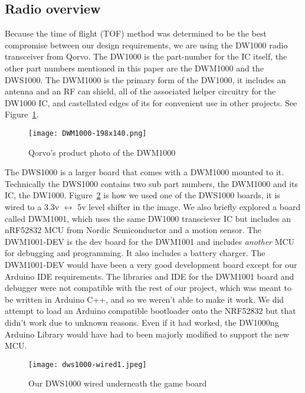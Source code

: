 \documentclass{article}
\begin{document}
\subsection{Radio overview}
Because the time of flight (TOF) method was determined to be the best compromise between our design requirements, we are using the DW1000 radio transceiver from Qorvo. The DW1000 is the part-number for the IC itself, the other part numbers mentioned in this paper are the DWM1000 and the DWS1000. The DWM1000 is the primary form of the DW1000, it includes an antenna and an RF can shield, all of the associated helper circuitry for the DW1000 IC, and castellated edges of its for convenient use in other projects. See Figure~\ref{fig:dwm1000_photo}.


\begin{figure}[h]
    \centering
    \texttt{[image: DWM1000-198x140.png]}
    \caption{Qorvo's product photo of the DWM1000}
    \label{fig:dwm1000_photo}
\end{figure}


The DWS1000 is a larger board that comes with a DWM1000 mounted to it. Technically the DWS1000 contains two sub part numbers, the DWM1000 and its IC, the DW1000. Figure~\ref{fig:dws1000_wired} is how we used one of the DWS1000 boards, it is wired to a 3.3v $\leftrightarrow$ 5v level shifter in the image. We also briefly explored a board called DWM1001, which uses the same DW1000 transciever IC but includes an nRF52832 MCU from Nordic Semiconductor and a motion sensor. The DWM1001-DEV is the dev board for the DWM1001 and includes \textit{another} MCU for debugging and programming. It also includes a battery charger. The DWM1001-DEV would have been a very good development board except for our Arduino IDE requirements. The libraries and IDE for the DWM1001 board and debugger were not compatible with the rest of our project, which was meant to be written in Arduino C++, and so we weren't able to make it work. We did attempt to load an Arduino compatible bootloader onto the NRF52832 but that didn't work due to unknown reasons. Even if it had worked, the DW1000ng Arduino Library would have had to been majorly modified to support the new MCU. 

\begin{figure}[h]
    \centering
    \texttt{[image: dws1000-wired1.jpeg]}
    \caption{Our DWS1000 wired underneath the game board}
    \label{fig:dws1000_wired}
\end{figure}
\end{document}

